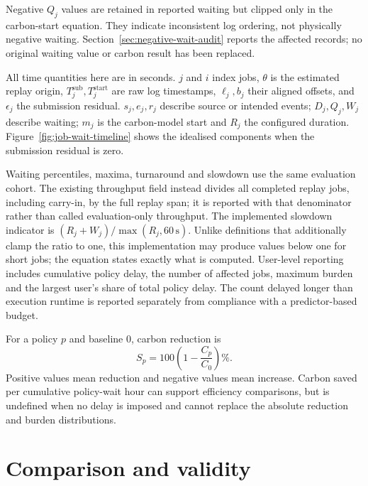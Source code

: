 Negative $Q_j$ values are retained in reported waiting but clipped only in the carbon-start equation. They indicate inconsistent log ordering, not physically negative waiting. Section~\ref{sec:negative-wait-audit} reports the affected records; no original waiting value or carbon result has been replaced.

All time quantities here are in seconds. $j$ and $i$ index jobs, $\theta$ is the estimated replay origin, $T_j^{\mathrm{sub}},T_j^{\mathrm{start}}$ are raw log timestamps, $\ell_j,b_j$ their aligned offsets, and $\epsilon_j$ the submission residual. $s_j,e_j,r_j$ describe source or intended events; $D_j,Q_j,W_j$ describe waiting; $m_j$ is the carbon-model start and $R_j$ the configured duration. Figure~\ref{fig:job-wait-timeline} shows the idealised components when the submission residual is zero.

\FloatBarrier

Waiting percentiles, maxima, turnaround and slowdown use the same evaluation cohort. The existing throughput field instead divides all completed replay jobs, including carry-in, by the full replay span; it is reported with that denominator rather than called evaluation-only throughput. The implemented slowdown indicator is $(R_j+W_j)/\max(R_j,60\,\mathrm{s})$. Unlike definitions that additionally clamp the ratio to one, this implementation may produce values below one for short jobs; the equation states exactly what is computed. User-level reporting includes cumulative policy delay, the number of affected jobs, maximum burden and the largest user's share of total policy delay. The count delayed longer than execution runtime is reported separately from compliance with a predictor-based budget.

For a policy $p$ and baseline $0$, carbon reduction is
\begin{equation}
S_p=100\left(1-\frac{C_p}{C_0}\right)\%.
\end{equation}
Positive values mean reduction and negative values mean increase. Carbon saved per cumulative policy-wait hour can support efficiency comparisons, but is undefined when no delay is imposed and cannot replace the absolute reduction and burden distributions.

\section{Comparison and validity}
